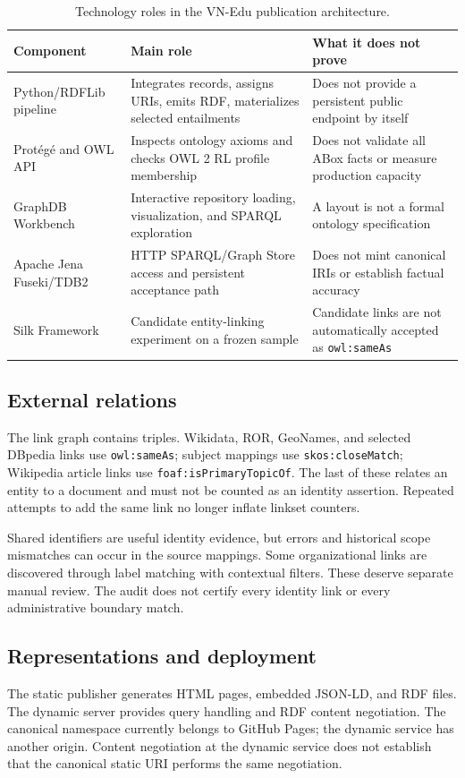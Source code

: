 \documentclass[11pt,a4paper]{article}
\newcommand{\term}[1]{\texttt{#1}}
\begin{document}
\begin{table}[htbp]\centering\small
\caption{Technology roles in the VN-Edu publication architecture.}\label{tab:technology-roles}
\begin{tabularx}{\textwidth}{p{3.0cm}XX}\toprule
Component & Main role & What it does not prove \\\midrule
Python/RDFLib pipeline & Integrates records, assigns URIs, emits RDF, materializes selected entailments & Does not provide a persistent public endpoint by itself \\
Protégé and OWL API & Inspects ontology axioms and checks OWL 2 RL profile membership & Does not validate all ABox facts or measure production capacity \\
GraphDB Workbench & Interactive repository loading, visualization, and SPARQL exploration & A layout is not a formal ontology specification \\
Apache Jena Fuseki/TDB2 & HTTP SPARQL/Graph Store access and persistent acceptance path & Does not mint canonical IRIs or establish factual accuracy \\
Silk Framework & Candidate entity-linking experiment on a frozen sample & Candidate links are not automatically accepted as \term{owl:sameAs} \\
\bottomrule
\end{tabularx}
\end{table}

\subsection{External relations}
The link graph contains \metricLinkTriples{} triples. Wikidata, ROR, GeoNames, and
selected DBpedia links use \term{owl:sameAs}; subject mappings use
\term{skos:closeMatch}; Wikipedia article links use \term{foaf:isPrimaryTopicOf}.
The last of these relates an entity to a document and must not be counted as an identity
assertion. Repeated attempts to add the same link no longer inflate linkset counters.

Shared identifiers are useful identity evidence, but errors and historical scope
mismatches can occur in the source mappings. Some organizational links are discovered
through label matching with contextual filters. These deserve separate manual review.
The audit does not certify every identity link or every administrative boundary match.

\subsection{Representations and deployment}
The static publisher generates HTML pages, embedded JSON-LD, and RDF files. The dynamic
server provides query handling and RDF content negotiation. The canonical namespace
currently belongs to GitHub Pages; the dynamic service has another origin. Content
negotiation at the dynamic service does not establish that the canonical static URI
performs the same negotiation.
\end{document}
